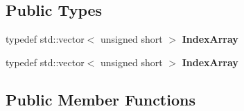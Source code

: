 \subsection*{Public Types}
\begin{DoxyCompactItemize}
\item 
\mbox{\label{classMesh_a12569e3787362603b658631533643e1a}} 
typedef std\+::vector$<$ unsigned short $>$ {\bfseries Index\+Array}
\item 
\mbox{\label{classMesh_a12569e3787362603b658631533643e1a}} 
typedef std\+::vector$<$ unsigned short $>$ {\bfseries Index\+Array}
\end{DoxyCompactItemize}
\subsection*{Public Member Functions}

